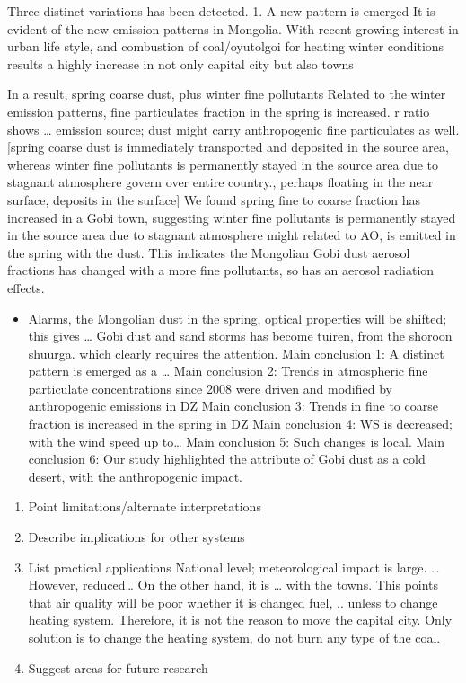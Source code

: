 \documentclass[
  11pt,
]{article}
\providecommand{\tightlist}{%
  \setlength{\itemsep}{0pt}\setlength{\parskip}{0pt}}
\begin{document}
Three distinct variations has been detected. 1. A new pattern is emerged
It is evident of the new emission patterns in Mongolia. With recent
growing interest in urban life style, and combustion of coal/oyutolgoi
for heating winter conditions results a highly increase in not only
capital city but also towns

In a result, spring coarse dust, plus winter fine pollutants Related to
the winter emission patterns, fine particulates fraction in the spring
is increased. r ratio shows \ldots{} emission source; dust might carry
anthropogenic fine particulates as well. {[}spring coarse dust is
immediately transported and deposited in the source area, whereas winter
fine pollutants is permanently stayed in the source area due to stagnant
atmosphere govern over entire country., perhaps floating in the near
surface, deposits in the surface{]} We found spring fine to coarse
fraction has increased in a Gobi town, suggesting winter fine pollutants
is permanently stayed in the source area due to stagnant atmosphere
might related to AO, is emitted in the spring with the dust. This
indicates the Mongolian Gobi dust aerosol fractions has changed with a
more fine pollutants, so has an aerosol radiation effects.

\begin{itemize}
\tightlist
\item
  Alarms, the Mongolian dust in the spring, optical properties will be
  shifted; this gives \ldots{} Gobi dust and sand storms has become
  tuiren, from the shoroon shuurga. which clearly requires the
  attention. Main conclusion 1: A distinct pattern is emerged as a
  \ldots{} Main conclusion 2: Trends in atmospheric fine particulate
  concentrations since 2008 were driven and modified by anthropogenic
  emissions in DZ Main conclusion 3: Trends in fine to coarse fraction
  is increased in the spring in DZ Main conclusion 4: WS is decreased;
  with the wind speed up to\ldots{} Main conclusion 5: Such changes is
  local. Main conclusion 6: Our study highlighted the attribute of Gobi
  dust as a cold desert, with the anthropogenic impact.
\end{itemize}

\begin{enumerate}
\def\labelenumi{\arabic{enumi}.}
\setcounter{enumi}{3}
\item
  Point limitations/alternate interpretations
\item
  Describe implications for other systems
\item
  List practical applications National level; meteorological impact is
  large. \ldots{} However, reduced\ldots{} On the other hand, it is
  \ldots{} with the towns. This points that air quality will be poor
  whether it is changed fuel, .. unless to change heating system.
  Therefore, it is not the reason to move the capital city. Only
  solution is to change the heating system, do not burn any type of the
  coal.
\item
  Suggest areas for future research
\end{enumerate}
\end{document}
